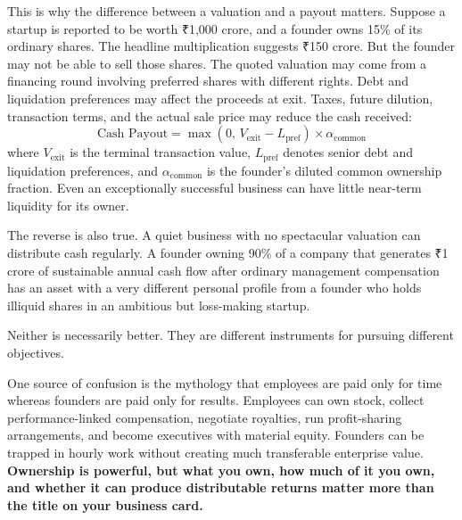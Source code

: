 This is why the difference between a valuation and a payout matters. Suppose a startup is reported to be worth ₹1,000 crore, and a founder owns 15\% of its ordinary shares. The headline multiplication suggests ₹150 crore. But the founder may not be able to sell those shares. The quoted valuation may come from a financing round involving preferred shares with different rights. Debt and liquidation preferences may affect the proceeds at exit. Taxes, future dilution, transaction terms, and the actual sale price may reduce the cash received:
\begin{equation}
  \text{Cash Payout} = \max\left(0, \, V_{\text{exit}} - L_{\text{pref}}\right) \times \alpha_{\text{common}} \label{eq:exit-proceeds}
\end{equation}
where $V_{\text{exit}}$ is the terminal transaction value, $L_{\text{pref}}$ denotes senior debt and liquidation preferences, and $\alpha_{\text{common}}$ is the founder's diluted common ownership fraction. Even an exceptionally successful business can have little near-term liquidity for its owner.

The reverse is also true. A quiet business with no spectacular valuation can distribute cash regularly. A founder owning 90\% of a company that generates ₹1 crore of sustainable annual cash flow after ordinary management compensation has an asset with a very different personal profile from a founder who holds illiquid shares in an ambitious but loss-making startup.

Neither is necessarily better. They are different instruments for pursuing different objectives.

One source of confusion is the mythology that employees are paid only for time whereas founders are paid only for results. Employees can own stock, collect performance-linked compensation, negotiate royalties, run profit-sharing arrangements, and become executives with material equity. Founders can be trapped in hourly work without creating much transferable enterprise value. \textbf{Ownership is powerful, but what you own, how much of it you own, and whether it can produce distributable returns matter more than the title on your business card.}
